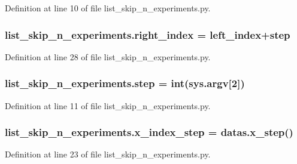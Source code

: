 Definition at line 10 of file list\+\_\+skip\+\_\+n\+\_\+experiments.\+py.

\subsubsection[{\texorpdfstring{right\+\_\+index}{right_index}}]{\setlength{\rightskip}{0pt plus 5cm}list\+\_\+skip\+\_\+n\+\_\+experiments.\+right\+\_\+index = {\bf left\+\_\+index}+{\bf step}}\hypertarget{namespacelist__skip__n__experiments_ac819b38ecab50279acd6b6506889bf59}{}\label{namespacelist__skip__n__experiments_ac819b38ecab50279acd6b6506889bf59}


Definition at line 28 of file list\+\_\+skip\+\_\+n\+\_\+experiments.\+py.

\subsubsection[{\texorpdfstring{step}{step}}]{\setlength{\rightskip}{0pt plus 5cm}list\+\_\+skip\+\_\+n\+\_\+experiments.\+step = int(sys.\+argv\mbox{[}2\mbox{]})}\hypertarget{namespacelist__skip__n__experiments_a2b0ba5c1eae77169da727be27ba77df8}{}\label{namespacelist__skip__n__experiments_a2b0ba5c1eae77169da727be27ba77df8}


Definition at line 11 of file list\+\_\+skip\+\_\+n\+\_\+experiments.\+py.

\subsubsection[{\texorpdfstring{x\+\_\+index\+\_\+step}{x_index_step}}]{\setlength{\rightskip}{0pt plus 5cm}list\+\_\+skip\+\_\+n\+\_\+experiments.\+x\+\_\+index\+\_\+step = datas.\+x\+\_\+step()}\hypertarget{namespacelist__skip__n__experiments_a05955a8175ac6d7e387276a35b520b56}{}\label{namespacelist__skip__n__experiments_a05955a8175ac6d7e387276a35b520b56}


Definition at line 23 of file list\+\_\+skip\+\_\+n\+\_\+experiments.\+py.

